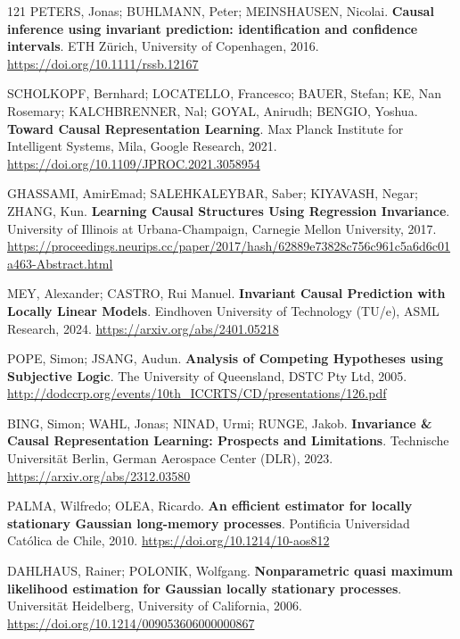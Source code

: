\begin{thebibliography}{121}
  PETERS, Jonas; BUHLMANN, Peter; MEINSHAUSEN, Nicolai.
  \newblock \textbf{Causal inference using invariant prediction: identification and confidence intervals}.
  \newblock ETH Zürich, University of Copenhagen, 2016.
  \newblock \url{https://doi.org/10.1111/rssb.12167}

  SCHOLKOPF, Bernhard; LOCATELLO, Francesco; BAUER, Stefan; KE, Nan Rosemary; KALCHBRENNER, Nal; GOYAL, Anirudh; BENGIO, Yoshua.
  \newblock \textbf{Toward Causal Representation Learning}.
  \newblock Max Planck Institute for Intelligent Systems, Mila, Google Research, 2021.
  \newblock \url{https://doi.org/10.1109/JPROC.2021.3058954}

  GHASSAMI, AmirEmad; SALEHKALEYBAR, Saber; KIYAVASH, Negar; ZHANG, Kun.
  \newblock \textbf{Learning Causal Structures Using Regression Invariance}.
  \newblock University of Illinois at Urbana-Champaign, Carnegie Mellon University, 2017.
  \newblock \url{https://proceedings.neurips.cc/paper/2017/hash/62889e73828c756c961c5a6d6c01a463-Abstract.html}

  MEY, Alexander; CASTRO, Rui Manuel.
  \newblock \textbf{Invariant Causal Prediction with Locally Linear Models}.
  \newblock Eindhoven University of Technology (TU/e), ASML Research, 2024.
  \newblock \url{https://arxiv.org/abs/2401.05218}

  POPE, Simon; JSANG, Audun.
  \newblock \textbf{Analysis of Competing Hypotheses using Subjective Logic}.
  \newblock The University of Queensland, DSTC Pty Ltd, 2005.
  \newblock \url{http://dodccrp.org/events/10th_ICCRTS/CD/presentations/126.pdf}

  BING, Simon; WAHL, Jonas; NINAD, Urmi; RUNGE, Jakob.
  \newblock \textbf{Invariance \& Causal Representation Learning: Prospects and Limitations}.
  \newblock Technische Universität Berlin, German Aerospace Center (DLR), 2023.
  \newblock \url{https://arxiv.org/abs/2312.03580}

  PALMA, Wilfredo; OLEA, Ricardo.
  \newblock \textbf{An efficient estimator for locally stationary Gaussian long-memory processes}.
  \newblock Pontificia Universidad Católica de Chile, 2010.
  \newblock \url{https://doi.org/10.1214/10-aos812}

  DAHLHAUS, Rainer; POLONIK, Wolfgang.
  \newblock \textbf{Nonparametric quasi maximum likelihood estimation for Gaussian locally stationary processes}.
  \newblock Universität Heidelberg, University of California, 2006.
  \newblock \url{https://doi.org/10.1214/009053606000000867}


\end{thebibliography}
